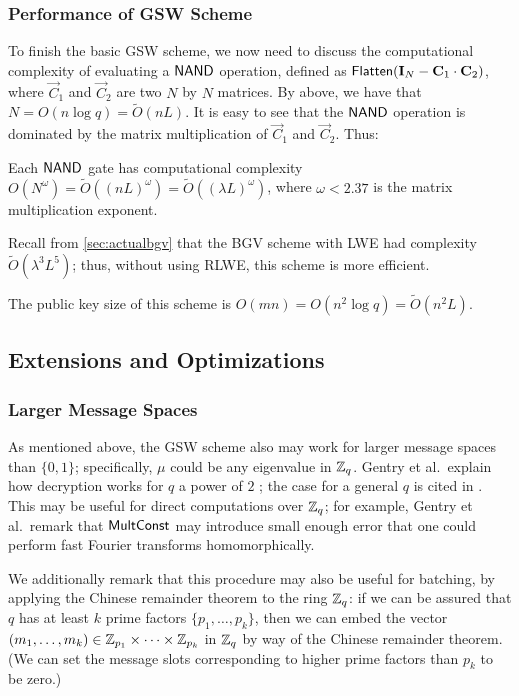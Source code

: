     \subsubsection{Performance of GSW Scheme}
    To finish the basic GSW scheme, we now need to discuss the computational complexity of evaluating a ${\sf NAND}$ operation, defined as ${\sf Flatten}(\vec{I}_N - \vec{C}_1 \cdot \vec{C}_2)$, where $\vec{C}_1$ and $\vec{C}_2$ are two $N$ by $N$ matrices. By above, we have that $N = O(n \log q) = \widetilde{O}(n L)$. It is easy to see that the ${\sf NAND}$ operation is dominated by the matrix multiplication of $\vec{C}_1$ and $\vec{C}_2$. Thus:
    \begin{lemma}
        Each ${\sf NAND}$ gate has computational complexity $O(N^\omega) = \widetilde{O}((nL)^\omega) = \widetilde{O}((\lambda L)^\omega)$, where $\omega < 2.37$ is the matrix multiplication exponent. \cite{gsw}
    \end{lemma}
    Recall from \ref{sec:actualbgv} that the BGV scheme with LWE had complexity $\widetilde{O}(\lambda^3 L^5)$; thus, without using RLWE, this scheme is more efficient.

    The public key size of this scheme is $O(mn) = O(n^2 \log q) = \widetilde{O}(n^2 L)$.

    \subsection{Extensions and Optimizations} \label{sec:gswextensions}
    \subsubsection{Larger Message Spaces}
    As mentioned above, the GSW scheme also may work for larger message spaces than $\{0,1\}$; specifically, $\mu$ could be any eigenvalue in $\Z_q$. Gentry et al.~explain how decryption works for $q$ a power of $2$ \cite{gsw}; the case for a general $q$ is cited in \cite{MP12}. This may be useful for direct computations over $\Z_q$; for example, Gentry et al.~remark that ${\sf MultConst}$ may introduce small enough error that one could perform fast Fourier transforms homomorphically.

    We additionally remark that this procedure may also be useful for batching, by applying the Chinese remainder theorem to the ring $\Z_q$: if we can be assured that $q$ has at least $k$ prime factors $\{p_1, \dots, p_k\}$, then we can embed the vector $(m_1, \dots, m_k) \in \Z_{p_1} \times \dots \times \Z_{p_k}$ in $\Z_q$ by way of the Chinese remainder theorem. (We can set the message slots corresponding to higher prime factors than $p_k$ to be zero.)

